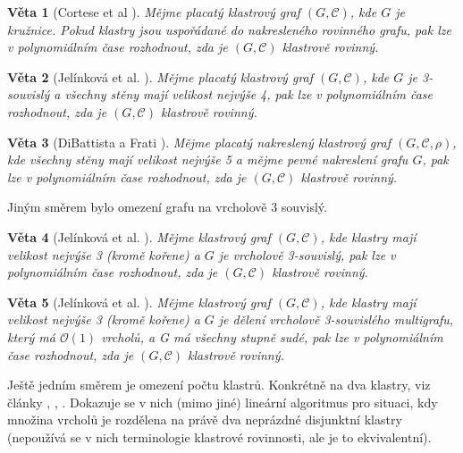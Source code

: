 \documentclass[12pt,a4report]{report}
\newtheorem{theorem}{Věta}[chapter]
\theoremstyle{definition}
\begin{document}
\begin{theorem}[Cortese et al \cite{CorteseEtAl09}]
Mějme placatý klastrový graf  $(G, \mathcal C)$, kde $G$ je kružnice. Pokud klastry jsou uspořádané do nakresleného rovinného grafu, pak lze v polynomiálním čase rozhodnout, zda je  $(G, \mathcal C)$ klastrově rovinný.
\end{theorem}

\begin{theorem}[Jelínková et al. \cite{JelinkovaEtAl07}]
Mějme placatý klastrový graf  $(G, \mathcal C)$, kde $G$ je 3-souvislý a všechny stěny mají velikost nejvýše 4, pak lze v polynomiálním čase rozhodnout, zda je  $(G, \mathcal C)$ klastrově rovinný.
\end{theorem}

\begin{theorem}[DiBattista a Frati \cite{DiBattistaFrati07}]
Mějme placatý nakreslený klastrový graf  $(G, \mathcal C, \rho)$, kde všechny stěny mají velikost nejvýše 5 a mějme pevné nakreslení grafu $G$, pak lze v polynomiálním čase rozhodnout, zda je  $(G, \mathcal C)$ klastrově rovinný.
\end{theorem}

Jiným směrem bylo omezení grafu na vrcholově 3 souvislý.

\begin{theorem}[Jelínková et al. \cite{JelinkovaEtAl07}]
Mějme klastrový graf $(G, \mathcal C)$, kde klastry mají velikost nejvýše 3 (kromě kořene) a $G$ je vrcholově 3-souvislý, pak lze v polynomiálním čase rozhodnout, zda je  $(G, \mathcal C)$ klastrově rovinný. 
\end{theorem}

\begin{theorem}[Jelínková et al. \cite{JelinkovaEtAl07}]
Mějme klastrový graf $(G, \mathcal C)$, kde klastry mají velikost nejvýše 3 (kromě kořene) a $G$ je dělení vrcholově 3-souvislého multigrafu, který má $\mathcal O(1)$ vrcholů, a G má všechny stupně sudé, pak lze v polynomiálním čase rozhodnout, zda je  $(G, \mathcal C)$ klastrově rovinný. 
\end{theorem}

Ještě jedním směrem je omezení počtu klastrů. Konkrétně na dva klastry, viz články \cite{BiedlI98}, \cite{BiedlII98}, \cite{BiedlIII98}. Dokazuje se v nich (mimo jiné) lineární algoritmus pro situaci, kdy množina vrcholů je rozdělena na právě dva neprázdné disjunktní klastry (nepoužívá se v nich terminologie klastrové rovinnosti, ale je to ekvivalentní). 
\end{document}
